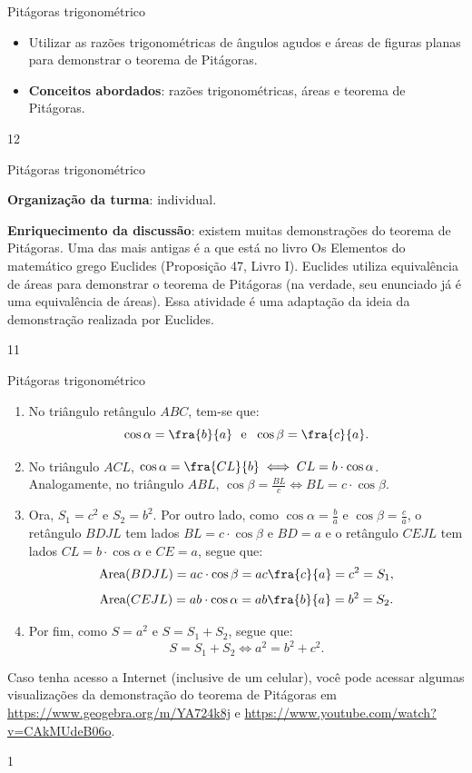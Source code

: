 \mspace{-1em}
\begin{objectives}{Pitágoras trigonométrico}
{
\begin{itemize}
\item Utilizar as razões trigonométricas de ângulos agudos e áreas de figuras planas para demonstrar o teorema de Pitágoras.
\item \textbf{Conceitos abordados}: razões trigonométricas, áreas e teorema de Pitágoras.
\end{itemize}

}{1}{2}
\end{objectives}
\begin{sugestions}{Pitágoras trigonométrico}
{
\textbf{Organização da turma}: individual.

\textbf{Enriquecimento da discussão}: existem muitas demonstrações do teorema de Pitágoras. Uma das mais antigas é a que está no livro Os Elementos do matemático grego Euclides (Proposição 47, Livro I). Euclides utiliza  equivalência de áreas para demonstrar o teorema de Pitágoras (na verdade, seu enunciado já é uma equivalência de áreas). Essa atividade é uma adaptação da ideia da demonstração realizada por Euclides.

}{1}{1}
\end{sugestions}
\mspace{-1em}
\begin{answer}{Pitágoras trigonométrico}
{
\begin{enumerate}
    \item{} 
    No  triângulo retângulo $ABC$, tem-se que:
    $$\cos \alpha=\fra{b}{a} \ \ \text{e} \ \ \cos \beta=\fra{c}{a}.$$
   
    \item{}
    No triângulo $ACL$, $\cos \alpha=\fra{CL}{b} \iff CL=b\cdot\cos \alpha$. Analogamente, no triângulo $ABL$, 
    $\cos \beta=\frac{BL}{c} \iff BL=c\cdot\cos \beta$.
    
    \item{} 
    Ora, $S_1=c^2$ e $S_2=b^2$. Por outro lado, como $\cos \alpha=\frac{b}{a}$ e  $\cos\beta=\frac{c}{a}$, 
    o retângulo $BDJL$ tem lados $BL=c\cdot\cos \beta$ e $BD=a$ e o retângulo $CEJL$ tem lados $CL=b\cdot\cos\alpha$ e $CE=a$, segue que:
    $$\text{Area}(BDJL)=ac\cdot\cos\beta=ac\fra{c}{a}=c^2=S_1,$$
    $$\text{Area}(CEJL)=ab\cdot\cos\alpha=ab\fra{b}{a}=b^2=S_2.$$
    
    \item{}
    Por fim, como $S=a^2$ e $S=S_1+S_2$, segue que:
    $$S=S_1+S_2 \iff a^2=b^2+c^2.$$
\end{enumerate}

Caso tenha acesso a Internet (inclusive de um celular), você pode acessar algumas visualizações da demonstração do teorema de Pitágoras em 
\url{https://www.geogebra.org/m/YA724k8j} e 
\url{https://www.youtube.com/watch?v=CAkMUdeB06o}.
}{1}
\end{answer}

